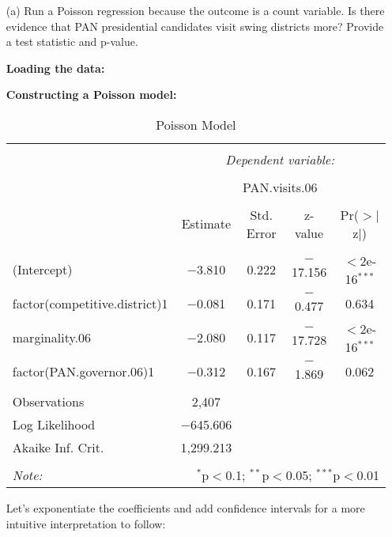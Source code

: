 \documentclass[12pt,letterpaper]{article}
\begin{document}
\begin{enumerate}
	\item [(a)]
	Run a Poisson regression because the outcome is a count variable. Is there evidence that PAN presidential candidates visit swing districts more? Provide a test statistic and p-value.
	
	\vspace{.25cm}
	\textbf{Loading the data:}
	 
	
	\vspace{.25cm}
	\textbf{Constructing a Poisson model:}
	 
	

\begin{table}[!htbp] \centering 
  \caption{Poisson Model} 
  \label{} 
\begin{tabular}{@{\extracolsep{5pt}}lcccc} 
\\[-1.8ex]\hline 
\hline \\[-1.8ex] 
 & \multicolumn{4}{c}{\textit{Dependent variable:}} \\ 
\cline{2-5} 
\\[-1.8ex] & \multicolumn{4}{c}{PAN.visits.06} \\ 
\\[-1.8ex] & Estimate & Std. Error & z-value & Pr($>$$|$z$|$) \\ 
\hline \\[-1.8ex] 
 (Intercept) & $-$3.810 & 0.222 & $-$17.156 & $<$2e-16$^{***}$ \\ 
  factor(competitive.district)1 & $-$0.081 & 0.171 & $-$0.477 & 0.634 \\ 
  marginality.06 & $-$2.080 & 0.117 & $-$17.728 & $<$2e-16$^{***}$ \\ 
  factor(PAN.governor.06)1 & $-$0.312 & 0.167 & $-$1.869 & 0.062 \\ 
\hline \\[-1.8ex] 
Observations & 2,407 & & & \\ 
Log Likelihood & $-$645.606 & & & \\ 
Akaike Inf. Crit. & 1,299.213 & & & \\ 
\hline 
\hline \\[-1.8ex] 
\textit{Note:}  & \multicolumn{4}{r}{$^{*}$p$<$0.1; $^{**}$p$<$0.05; $^{***}$p$<$0.01} \\ 
\end{tabular} 
\end{table}
	
		Let's exponentiate the coefficients and add confidence intervals for a more intuitive interpretation to follow: 
	

\end{enumerate}
\end{document}
